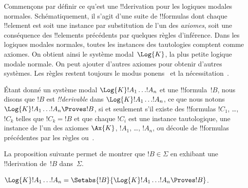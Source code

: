 \documentclass[../../../include/open-logic-section]{subfiles}
\begin{document}


Commençons par définir ce qu'est une !!{derivation} pour les logiques
modales normales. Schématiquement, il s'agit d'une suite de
!!{formula}s dont chaque !!{element} est soit une instance par
substitution de l'un des \emph{axiomes}, soit une conséquence des
!!{element}s précédents par quelques règles d'inférence. Dans les
logiques modales normales, toutes les instances des
tautologies
comptent comme axiomes. On obtient ainsi le système modal~$\Log{K}$,
la plus petite logique modale normale. On peut ajouter d'autres
axiomes pour obtenir d'autres systèmes. Les règles restent toujours
le modus ponens~\MP{} et la nécessitation~\Nec.

\begin{defn}
  Étant donné un système modal $\Log{K} !A_1 \dots !A_n$ et une
  !!{formula}~$!B$, nous disons que $!B$ est
  \emph{!!{derivable}} dans $\Log{K} !A_1 \dots !A_n$, ce que nous
  notons $\Log{K} !A_1 \dots !A_n \Proves !B$, si et seulement s'il
  existe des !!{formula}s $!C_1$, \dots, $!C_k$ telles que
  $!C_k = !B$ et que chaque $!C_i$ est une instance tautologique,
  une instance de l'un des axiomes $\Ax{K}$, $!A_1$, \dots, $!A_n$, ou découle de !!{formula}s
  précédentes par les règles \MP{} ou~\Nec.
\end{defn}

La proposition suivante permet de montrer que $!B \in \Sigma$ en
exhibant une !!{derivation} de~$!B$ dans~$\Sigma$.

\begin{prop}
  $\Log{K} !A_1 \dots !A_n = \Setabs{!B}{\Log{K} !A_1 \dots !A_n \Proves !B}$.
\end{prop}
\end{document}
